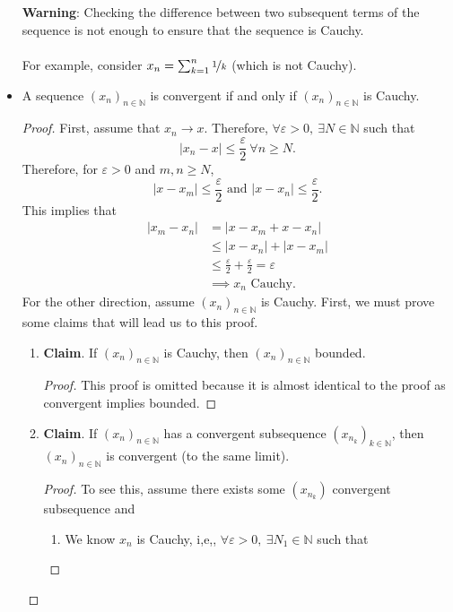 \documentclass{article}
\newcommand{\N}{\mathbb{N}}
\newcommand{\seq}[2]{(#1_{#2})_{#2 \in \N}}
\newcommand{\?}{\stackrel{?}{=}}
\theoremstyle{definition} %
\begin{document}
\begin{itemize}
    \textbf{Warning}: Checking the difference between two subsequent terms of the sequence is not enough to ensure that the sequence is Cauchy. \\\\
    For example, consider $x_n = \sum_{k = 1}^n \nicefrac{1}{k}$ (which is not Cauchy).
    \item[]
    \begin{lemma}
        A sequence $\seq{x}{n}$ is convergent if and only if $\seq{x}{n}$ is Cauchy.
    \end{lemma}
    \begin{proof}
        First, assume that $x_n \rightarrow x$. Therefore, $\forall \varepsilon > 0, \ \exists N \in \N$ such that
        $$|x_n - x| \leq \frac{\varepsilon}{2} \ \forall n \geq N.$$
        Therefore, for $\varepsilon > 0$ and $m, n \geq N$,
        $$|x - x_m| \leq \frac{\varepsilon}{2} \text{ and } |x - x_n| \leq \frac{\varepsilon}{2}.$$
        This implies that
        \begin{align*}
            |x_m - x_n| &= |x - x_m + x - x_n| \\
            &\leq |x - x_n| + |x - x_m| \\
            &\leq \frac{\varepsilon}{2} + \frac{\varepsilon}{2} = \varepsilon \\
            &\implies x_n \text{ Cauchy}.
        \end{align*}
        For the other direction, assume $\seq{x}{n}$ is Cauchy. First, we must prove some claims that will lead us to this proof.
        \begin{enumerate}[label=(\arabic*)]
            \item \textbf{Claim}. If $\seq{x}{n}$ is Cauchy, then $\seq{x}{n}$ bounded.
            \begin{proof}
                This proof is omitted because it is almost identical to the proof as convergent implies bounded.
            \end{proof}
            \item \textbf{Claim}. If $\seq{x}{n}$ has a convergent subsequence $(x_{n_k})_{k \in \N}$, then $\seq{x}{n}$ is convergent (to the same limit).
            \begin{proof}
                To see this, assume there exists some $(x_{n_k})$ convergent subsequence and
                \begin{enumerate}[label=(\roman*)]
                    \item We know $x_n$ is Cauchy, i,e,, $\forall \varepsilon > 0, \ \exists N_1 \in \N$ such that

\end{enumerate}
\end{proof}
\end{enumerate}
\end{proof}
\end{itemize}
\end{document}
